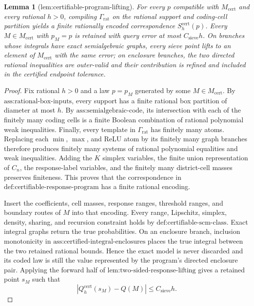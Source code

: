 \documentclass{article}
\newtheorem{lemma}{Lemma}
\begin{document}
\begin{lemma}[lem:certifiable-program-lifting]\label{lem:certifiable-program-lifting}
For every \(p\) compatible with \(M_{\mathrm{cert}}\) and every rational \(h>0\), compiling \(\Gamma_{\mathrm{rat}}\) on the rational support and coding-cell partition yields a finite rationally encoded correspondence \(S_h^{\mathrm{cert}}(p)\). Every \(M\in M_{\mathrm{cert}}\) with \(p_M=p\) is retained with query error at most \(C_{\mathrm{sieve}}h\). On branches whose integrals have exact semialgebraic graphs, every sieve point lifts to an element of \(M_{\mathrm{cert}}\) with the same error; on enclosure branches, the two directed rational inequalities are outer-valid and their contribution is refined and included in the certified endpoint tolerance.
\end{lemma}
\begin{proof}
Fix rational \(h>0\) and a law \(p=p_M\) generated by some \(M\in M_{\mathrm{cert}}\).  By \(\text{ass:rational-box-inputs}\), every support has a finite rational box partition of diameter at most \(h\).  By \(\text{ass:semialgebraic-code}\), its intersection with each of the finitely many coding cells is a finite Boolean combination of rational polynomial weak inequalities.  Finally, every template in \(\Gamma_{\mathrm{rat}}\) has finitely many atoms.  Replacing each \(\min\), \(\max\), and ReLU atom by its finitely many graph branches therefore produces finitely many systems of rational polynomial equalities and weak inequalities.  Adding the \(K\) simplex variables, the finite union representation of \(C_n\), the response-label variables, and the finitely many district-cell masses preserves finiteness.  This proves that the correspondence in \(\text{def:certifiable-response-program}\) has a finite rational encoding.

Insert the coefficients, cell masses, response ranges, threshold ranges, and boundary routes of \(M\) into that encoding.  Every range, Lipschitz, simplex, density, sharing, and recursion constraint holds by \(\text{def:certifiable-scm-class}\).  Exact integral graphs return the true probabilities.  On an enclosure branch, inclusion monotonicity in \(\text{ass:certified-integral-enclosures}\) places the true integral between the two retained rational bounds.  Hence the exact model is never discarded and its coded law is still the value represented by the program's directed enclosure pair.  Applying the forward half of \(\text{lem:two-sided-response-lifting}\) gives a retained point \(s_M\) such that
\[
|Q_h^{\mathrm{cert}}(s_M)-Q(M)|\leq C_{\mathrm{sieve}}h.          \tag{9}
\]


\end{proof}
\end{document}
